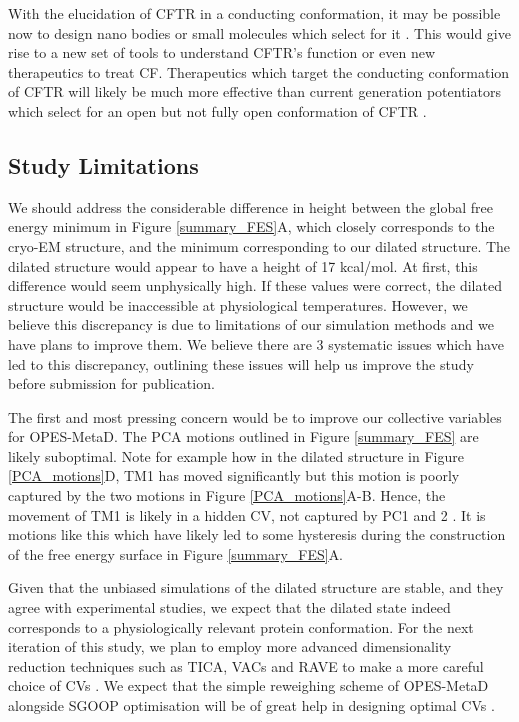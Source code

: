 With the elucidation of CFTR in a conducting conformation, it may be possible now to design nano bodies or small molecules which select for it \cite{hutter2019}. This would give rise to a new set of tools to understand CFTR's function or even new therapeutics to treat CF. Therapeutics which target the conducting conformation of CFTR will likely be much more effective than current generation potentiators which select for an open but not fully open conformation of CFTR \cite{csanady2019, yeh2017}. 

\subsection{Study Limitations}

We should address the considerable difference in height between the global free energy minimum in Figure \ref{summary_FES}A, which closely corresponds to the cryo-EM structure, and the minimum corresponding to our dilated structure. The dilated structure would appear to have a height of 17 kcal/mol. At first, this difference would seem unphysically high. If these values were correct, the dilated structure would be inaccessible at physiological temperatures. However, we believe this discrepancy is due to limitations of our simulation methods and we have plans to improve them. We believe there are 3 systematic issues which have led to this discrepancy, outlining these issues will help us improve the study before submission for publication. 

The first and most pressing concern would be to improve our collective variables for OPES-MetaD. The PCA motions outlined in Figure \ref{summary_FES} are likely suboptimal. Note for example how in the dilated structure in Figure \ref{PCA_motions}D, TM1 has moved significantly but this motion is poorly captured by the two motions in Figure \ref{PCA_motions}A-B. Hence, the movement of TM1 is likely in a hidden CV, not captured by PC1 and 2 \cite{bussi2015, bussi2020a}. It is motions like this which have likely led to some hysteresis during the construction of the free energy surface in Figure \ref{summary_FES}A. 

Given that the unbiased simulations of the dilated structure are stable, and they agree with experimental studies, we expect that the dilated state indeed corresponds to a physiologically relevant protein conformation. For the next iteration of this study, we plan to employ more advanced dimensionality reduction techniques such as TICA, VACs and RAVE to make a more careful choice of CVs \cite{brotzakis2019, noe2001, schultze2021, brotzakis2019, ribeiro2018}. We expect that the simple reweighing scheme of OPES-MetaD alongside SGOOP optimisation will be of great help in designing optimal CVs \cite{invernizzi2020, invernizzi2022, smith2018, tiwary2016b}. 

